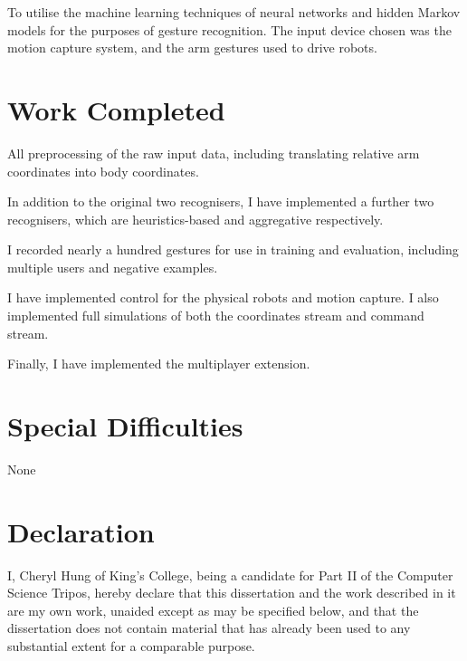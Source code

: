 \documentclass[12pt,a4,notitlepage]{report}
\renewcommand{\_}{\texttt{\symbol{95}}}
\newcommand{\<}{\texttt{\symbol{60}}}
\renewcommand{\>}{\texttt{\symbol{62}}}
\begin{document}
To utilise the machine learning techniques of neural networks and hidden Markov models for the purposes of gesture recognition. The input device chosen was the motion capture system, and the arm gestures used to drive robots.

\section*{Work Completed}

All preprocessing of the raw input data, including translating relative arm coordinates into body coordinates.

In addition to the original two recognisers, I have implemented a further two recognisers, which are heuristics-based and aggregative respectively.

I recorded nearly a hundred gestures for use in training and evaluation, including multiple users and negative examples.

I have implemented control for the physical robots and motion capture. I also implemented full simulations of both the coordinates stream and command stream.

Finally, I have implemented the multiplayer extension.

\section*{Special Difficulties}

None
 
\newpage
\section*{Declaration}

I, Cheryl Hung of King's College, being a candidate for Part II of the Computer Science Tripos, hereby declare that this dissertation and the work described in it are my own work, unaided except as may be specified below, and that the dissertation does not contain material that has already been used to any substantial extent for a comparable purpose.

\bigskip
{}

\medskip
{}

\cleardoublepage

\tableofcontents

\listoffigures

\end{document}
